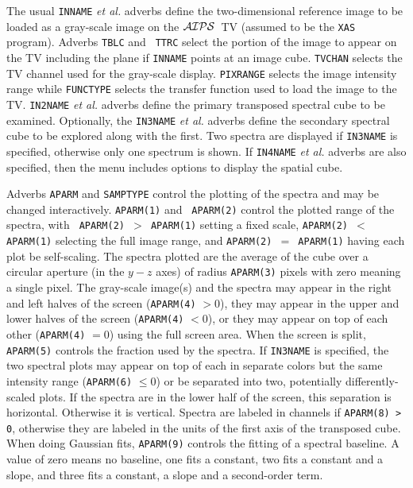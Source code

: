 \documentclass[twoside]{article}
\newcommand{\AIPS}{{$\cal AIPS\/$}}
\begin{document}
The usual {\tt INNAME} {\it et al.} adverbs define the two-dimensional
reference image to be loaded as a gray-scale image on the \AIPS\ TV
(assumed to be the {\tt XAS} program).  Adverbs {\tt TBLC} and {\tt
  TTRC} select the portion of the image to appear on the TV including
the plane if {\tt INNAME} points at an image cube.  {\tt TVCHAN}
selects the TV channel used for the gray-scale display. {\tt PIXRANGE}
selects the image intensity range while {\tt FUNCTYPE} selects the
transfer function used to load the image to the TV\@.  {\tt IN2NAME}
{\it et al.} adverbs define the primary transposed spectral cube to be
examined.  Optionally, the {\tt IN3NAME} {\it et al.} adverbs define
the secondary spectral cube to be explored along with the first.  Two
spectra are displayed if {\tt IN3NAME} is specified, otherwise only
one spectrum is shown.  If {\tt IN4NAME} {\it et al.} adverbs are also
specified, then the menu includes options to display the spatial cube.

Adverbs {\tt APARM} and {\tt SAMPTYPE} control the plotting of the
spectra and may be changed interactively.  {\tt APARM(1)} and {\tt
  APARM(2)} control the plotted range of the spectra, with {\tt
  APARM(2) $>$ APARM(1)} setting a fixed scale, {\tt APARM(2) $<$
  APARM(1)} selecting the full image range, and {\tt APARM(2) $=$
  APARM(1)} having each plot be self-scaling.  The spectra plotted are
the average of the cube over a circular aperture (in the $y-z$ axes)
of radius {\tt APARM(3)} pixels with zero meaning a single pixel.  The
gray-scale image(s) and the spectra may appear in the right and left
halves of the screen ({\tt APARM(4)} $> 0$), they may appear in the
upper and lower halves of the screen ({\tt APARM(4)} $< 0$), or they
may appear on top of each other ({\tt APARM(4)} $= 0$) using the full
screen area.  When the screen is split, {\tt APARM(5)} controls the
fraction used by the spectra.  If {\tt IN3NAME} is specified, the two
spectral plots may appear on top of each in separate colors but the
same intensity range ({\tt APARM(6)} $\leq 0$) or be separated into
two, potentially differently-scaled plots.  If the spectra are in the
lower half of the screen, this separation is horizontal.  Otherwise it
is vertical.  Spectra are labeled in channels if {\tt APARM(8) > 0},
otherwise they are labeled in the units of the first axis of the
transposed cube.  When doing Gaussian fits, {\tt APARM(9)} controls
the fitting of a spectral baseline.  A value of zero means no
baseline, one fits a constant, two fits a constant and a slope, and
three fits a constant, a slope and a second-order term.
\end{document}
